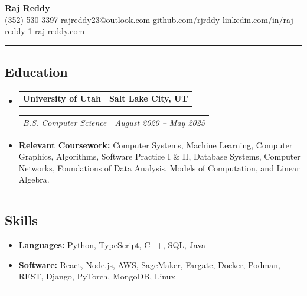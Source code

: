 \documentclass[11pt,letterpaper]{article}
\makeatletter
\newcommand{\headerrow}[2]
{\begin{tabular*}{\linewidth}{l@{\extracolsep{\fill}}r}
#1 &
#2 \\
\end{tabular*}}
\makeatother
\begin{document}
\begin{center}
	{\LARGE \textbf{Raj Reddy}}\\
	\vspace{0.05cm}
	(352) 530-3397
    \hfill rajreddy23@outlook.com
    \hfill github.com/rjrddy
    \hfill linkedin.com/in/raj-reddy-1
    \hfill raj-reddy.com
\end{center}
\hrule

\vspace{-1em}
\subsection*{\Large Education}
\renewcommand\labelitemi{}
\begin{itemize}[leftmargin=1em]
	\parskip=0.1em
	\item
	      \headerrow
	      {\textbf{University of Utah}}
	      {\textbf{Salt Lake City, UT}}
	      \headerrow
	      {\emph{B.S. Computer Science}}
	      {\emph{August 2020 -- May 2025}}
	      \item \textbf{Relevant Coursework:} Computer Systems, Machine Learning, Computer Graphics, Algorithms, Software Practice I \& II, Database Systems, Computer Networks, Foundations of Data Analysis, Models of Computation, and Linear Algebra.
\end{itemize}
\hrule

\vspace{-1em}
\subsection*{\Large Skills}
\begin{itemize}[leftmargin=1em]
    \parskip=0.1em
	\item \textbf{Languages:} Python, TypeScript, C++, SQL, Java
	\item \textbf{Software:} React, Node.js, AWS, SageMaker, Fargate, Docker, Podman, REST, Django, PyTorch, MongoDB, Linux
\end{itemize}
\hrule

\vspace{-1em}
\end{document}
